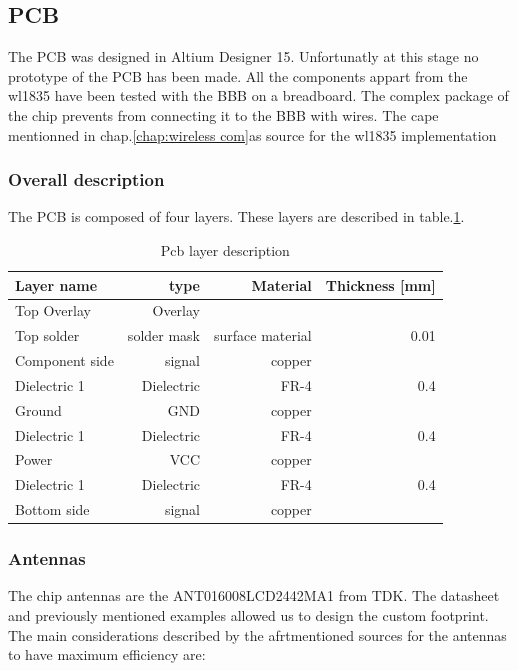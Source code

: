 \subsection{PCB}
\label{chap:pcb}
The PCB was designed in Altium Designer 15. Unfortunatly at this stage no prototype of the PCB has been made. All the components appart from the wl1835 have been tested with the BBB on a breadboard. The complex package of the chip prevents from connecting it to the BBB with wires. The cape mentionned in chap.\ref{chap:wireless com}as source for the wl1835 implementation

\subsubsection{Overall description}
The PCB is composed of four layers. These layers are described in table.\ref{tab:layer description}.
\begin{table}[!htbp]
  \begin{center}
    \begin{tabular}{|l|r|r|r|}%
      \hline
        Layer name & type & Material & Thickness [mm] \\ \hline \hline
        Top Overlay & Overlay & & \\ \hline
        Top solder & solder mask & surface material & 0.01 \\ \hline
        Component side & signal & copper &  \\ \hline
        Dielectric 1 & Dielectric & FR-4 & 0.4 \\ \hline
        Ground & GND & copper &\\ \hline
        Dielectric 1 & Dielectric & FR-4 & 0.4 \\ \hline
        Power & VCC & copper & \\ \hline
        Dielectric 1 & Dielectric & FR-4 & 0.4 \\ \hline
        Bottom side & signal & copper &\\ \hline
         \hline
    \end{tabular}
  \end{center}
  \caption {Pcb layer description} \label{tab:layer description}
\end{table}


\subsubsection{Antennas}
The chip antennas are the ANT016008LCD2442MA1 from TDK. The datasheet and previously mentioned examples allowed us to design the custom footprint.
The main considerations described by the afrtmentioned sources for the antennas to have maximum efficiency are:

